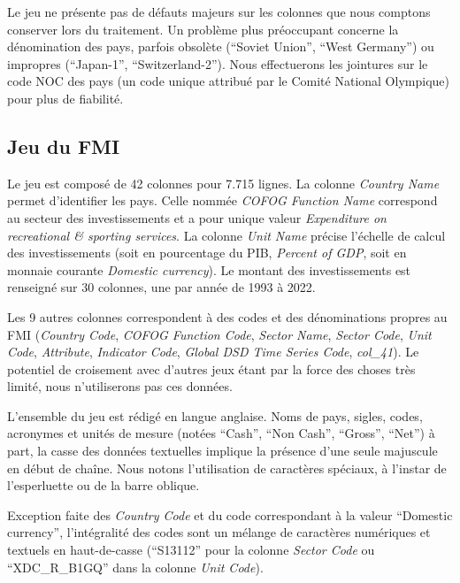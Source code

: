 \documentclass[hidelinks, 12pt]{report}
\begin{document}
Le jeu ne présente pas de défauts majeurs sur les colonnes que nous comptons conserver lors du traitement. Un problème plus préoccupant concerne la dénomination des pays, parfois obsolète (\enquote{Soviet Union}, \enquote{West Germany}) ou impropres (\enquote{Japan-1}, \enquote{Switzerland-2}). Nous effectuerons les jointures sur le code NOC des pays (un code unique attribué par le Comité National Olympique) pour plus de fiabilité.





%





\subsection{Jeu du FMI}

Le jeu est composé de 42 colonnes pour 7.715 lignes. La colonne \textit{Country Name} permet d'identifier les pays. Celle nommée \textit{COFOG Function Name} correspond au secteur des investissements et a pour unique valeur \textit{Expenditure on recreational \& sporting services}. La colonne \textit{Unit Name} précise l'échelle de calcul des investissements (soit en pourcentage du PIB, \textit{Percent of GDP}, soit en monnaie courante \textit{Domestic currency}). Le montant des investissements est renseigné sur 30 colonnes, une par année de 1993 à 2022.

Les 9 autres colonnes correspondent à des codes et des dénominations propres au FMI (\textit{Country Code}, \textit{COFOG Function Code}, \textit{Sector Name}, \textit{Sector Code}, \textit{Unit Code}, \textit{Attribute}, \textit{Indicator Code}, \textit{Global DSD Time Series Code}, \textit{col\_41}). Le potentiel de croisement avec d'autres jeux étant par la force des choses très limité, nous n'utiliserons pas ces données.

L'ensemble du jeu est rédigé en langue anglaise. Noms de pays, sigles, codes, acronymes et unités de mesure (notées \enquote{Cash}, \enquote{Non Cash}, \enquote{Gross}, \enquote{Net}) à part, la casse des données textuelles implique la présence d'une seule majuscule en début de chaîne. Nous notons l'utilisation de caractères spéciaux, à l'instar de l'esperluette ou de la barre oblique.

Exception faite des \textit{Country Code} et du code correspondant à la valeur \enquote{Domestic currency}, l'intégralité des codes sont un mélange de caractères numériques et textuels en haut-de-casse (\enquote{S13112} pour la colonne \textit{Sector Code} ou \enquote{XDC\_R\_B1GQ} dans la colonne \textit{Unit Code}).
\end{document}
